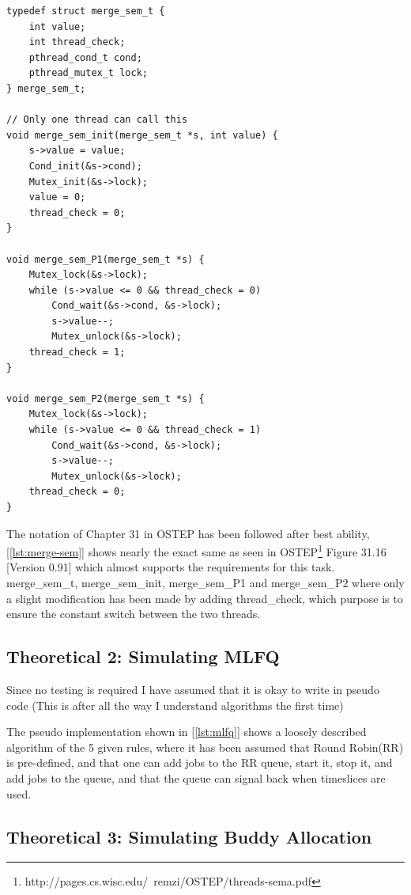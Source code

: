 \documentclass[11pt,a4paper]{article}
\theoremstyle{plain}
\theoremstyle{definition}
\theoremstyle{remark}
\numberwithin{equation}{section}
\begin{document}
\begin{lstlisting}[caption={Pseudo Code},label={lst:merge-sem}]
typedef struct merge_sem_t {
    int value;
    int thread_check;
    pthread_cond_t cond;
    pthread_mutex_t lock;
} merge_sem_t;

// Only one thread can call this
void merge_sem_init(merge_sem_t *s, int value) {
    s->value = value;
    Cond_init(&s->cond);
    Mutex_init(&s->lock);
    value = 0;
    thread_check = 0;
}

void merge_sem_P1(merge_sem_t *s) {
    Mutex_lock(&s->lock);
    while (s->value <= 0 && thread_check = 0)
        Cond_wait(&s->cond, &s->lock);
        s->value--;
        Mutex_unlock(&s->lock);
    thread_check = 1;
}

void merge_sem_P2(merge_sem_t *s) {
    Mutex_lock(&s->lock);
    while (s->value <= 0 && thread_check = 1)
        Cond_wait(&s->cond, &s->lock);
        s->value--;
        Mutex_unlock(&s->lock);
    thread_check = 0;
}
\end{lstlisting}

The notation of Chapter 31 in OSTEP has been followed after best ability, [\ref{lst:merge-sem}] shows nearly the exact same as seen in OSTEP\footnote{http://pages.cs.wisc.edu/~remzi/OSTEP/threads-sema.pdf} Figure 31.16 [Version 0.91] which almost supports the requirements for this task. merge\_sem\_t, merge\_sem\_init, merge\_sem\_P1 and merge\_sem\_P2 where only a slight modification has been made by adding thread\_check, which purpose is to ensure the constant switch between the two threads.


\pagebreak
\subsection*{Theoretical 2: Simulating MLFQ}

Since no testing is required I have assumed that it is okay to write in pseudo code (This is after all the way I understand algorithms the first time)

The pseudo implementation shown in [\ref{lst:mlfq}] shows a loosely described algorithm of the 5 given rules, where it has been assumed that Round Robin(RR) is pre-defined, and that one can add jobs to the RR queue, start it, stop it, and add jobs to the queue, and that the queue can signal back when timeslices are used.


\subsection*{Theoretical 3: Simulating Buddy Allocation}
\end{document}
